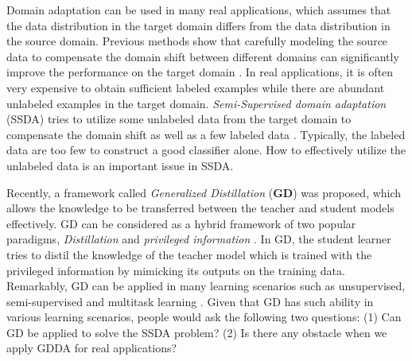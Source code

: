 
Domain adaptation can be used in many real applications, which assumes that the data distribution in the target domain differs from the data distribution in the source domain. Previous methods show that carefully modeling the source data to compensate the domain shift between different domains can significantly improve the performance on the target domain \cite{donahue2013semi}. In real applications, it is often very expensive to obtain sufficient labeled examples while there are abundant unlabeled examples in the target domain. 
\textit{Semi-Supervised domain adaptation} (SSDA) tries to utilize some unlabeled data from the target domain to compensate the domain shift as well as a few labeled data \cite{karl2001long}. Typically, the labeled data are too few to  construct a good classifier alone. How to effectively utilize the unlabeled data is an important issue in SSDA. 

Recently, a framework called \textit{Generalized Distillation} (\textbf{GD}) \cite{lopez2015unifying} was proposed, which allows the knowledge to be transferred between the teacher and student models effectively. GD can be considered as a hybrid framework of two popular paradigms, \textit{Distillation} \cite{hinton2015distilling} and \textit{privileged information} \cite{vapnik2015learning}. In GD, the student learner tries to distil the knowledge of the teacher model which is trained with the privileged information by  mimicking its outputs on the training data. Remarkably, GD can be applied in many learning scenarios such as unsupervised, semi-supervised and multitask learning \cite{lopez2015unifying}. Given that GD has such ability in various learning scenarios, people would ask the following two questions: (1) Can GD be applied to solve the SSDA problem? (2) Is there any obstacle when we apply GDDA for real applications?

